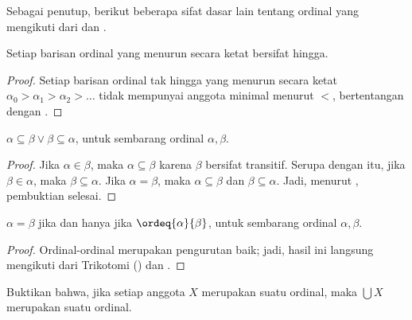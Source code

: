 \documentclass[../../../include/open-logic-section]{subfiles}
\begin{document}
Sebagai penutup, berikut beberapa sifat dasar lain tentang ordinal yang
mengikuti dari  dan .

\begin{prop}
Setiap barisan ordinal yang menurun secara ketat bersifat hingga.
\end{prop}

\begin{proof}
Setiap barisan ordinal tak hingga yang menurun secara ketat $\alpha_0 >
\alpha_1 > \alpha_2 > \ldots$ tidak mempunyai anggota minimal menurut $<$,
bertentangan dengan .
\end{proof}

\begin{prop}
$\alpha \subseteq \beta \lor \beta \subseteq \alpha$, untuk sembarang
ordinal $\alpha, \beta$.
\end{prop}

\begin{proof}
Jika $\alpha \in \beta$, maka $\alpha \subseteq \beta$ karena $\beta$
bersifat transitif. Serupa dengan itu, jika $\beta \in \alpha$, maka $\beta
\subseteq \alpha$. Jika $\alpha = \beta$, maka $\alpha \subseteq \beta$ dan
$\beta \subseteq \alpha$. Jadi, menurut , pembuktian
selesai.
\end{proof}

\begin{prop}
$\alpha = \beta$ jika dan hanya jika $\ordeq{\alpha}{\beta}$, untuk
sembarang ordinal $\alpha, \beta$.
\end{prop}

\begin{proof}
Ordinal-ordinal merupakan pengurutan baik; jadi, hasil ini langsung mengikuti
dari Trikotomi () dan
.
\end{proof}

\begin{prob}
Buktikan bahwa, jika setiap anggota $X$ merupakan suatu ordinal, maka
$\bigcup X$ merupakan suatu ordinal.
\end{prob}
\end{document}
